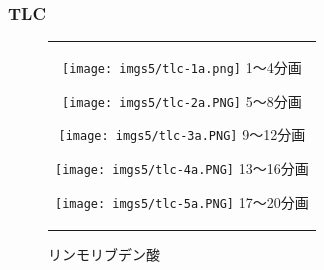 \documentclass[a4paper,papersize,dvipdfmx]{jsarticle}
\begin{document}
\subsubsection*{TLC}


\begin{figure}[htbp]
\begin{center}
\begin{tabular}{c}

\begin{minipage}{0.19\hsize}
\begin{center}
\texttt{[image: imgs5/tlc-1a.png]}
\hspace{1.6cm} 1〜4分画
\end{center}
\end{minipage}

\begin{minipage}{0.19\hsize}
\begin{center}
\texttt{[image: imgs5/tlc-2a.PNG]}
\hspace{1.6cm} 5〜8分画
\end{center}
\end{minipage}

\begin{minipage}{0.19\hsize}
\begin{center}
\texttt{[image: imgs5/tlc-3a.PNG]}
\hspace{1.6cm} 9〜12分画
\end{center}
\end{minipage}

\begin{minipage}{0.19\hsize}
\begin{center}
\texttt{[image: imgs5/tlc-4a.PNG]}
\hspace{1.6cm} 13〜16分画
\end{center}
\end{minipage}

\begin{minipage}{0.19\hsize}
\begin{center}
\texttt{[image: imgs5/tlc-5a.PNG]}
\hspace{1.6cm} 17〜20分画
\end{center}
\end{minipage}

\end{tabular}
\caption{リンモリブデン酸}
\end{center}
\end{figure}


\
\end{document}
